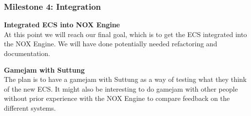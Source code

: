 \subsubsection{Milestone 4: Integration}
\noindent\textbf{Integrated ECS into NOX Engine}\\
At this point we will reach our final goal, which is to get the ECS integrated into the NOX Engine.
We will have done potentially needed refactoring and documentation.

\noindent\textbf{Gamejam with Suttung}\\
The plan is to have a gamejam with Suttung as a way of testing what they think of the new ECS.
It might also be interesting to do gamejam with other people without prior experience with the NOX Engine
to compare feedback on the different systems.

